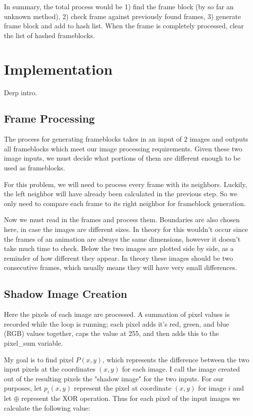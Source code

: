 \documentclass[conference]{IEEEtran}
\begin{document}
In summary, the total process would be 1) find the frame block (by so far an unknown method), 2) check frame against previously found frames, 3) generate frame block and add to hash list. When the frame is completely processed, clear the list of hashed frameblocks.

\section{Implementation}
\label{sec:implementation}
Derp intro.

\subsection{Frame Processing}
\label{subsec:frame_processing}
The process for generating frameblocks takes in an input of 2 images and
outputs all frameblocks which meet our image processing requirements.
Given these two image inputs,
we must decide what portions of them are different enough to be used as frameblocks.

For this problem, we will need to process every frame with its neighbors.
Luckily, the left neighbor will have already been calculated in the previous step.
So we only need to compare each frame to its right neighbor for frameblock generation.

Now we must read in the frames and process them.
Boundaries are also chosen here, in case the images are different sizes.
In theory for this wouldn't occur since the frames of an animation are always the same dimensions,
however it doesn't take much time to check. Below the two images are plotted side by side,
as a reminder of how different they appear.
In theory these images should be two consecutive frames,
which usually means they will have very small differences.

\subsection{Shadow Image Creation}
\label{subsec:shadow_image_creation}
Here the pixels of each image are processed.
A summation of pixel values is recorded while the loop is running;
each pixel adds it's red, green, and blue (RGB) values together,
caps the value at 255, and then adds this to the pixel\_sum variable.

My goal is to find pixel $P(x,y)$,
which represents the difference between the two input
pixels at the coordinates $(x,y)$ for each image.
I call the image created out of the resulting pixels the "shadow image" for the two inputs.
For our purposes, let $p_i(x,y)$ represent the pixel at coordinate
$(x,y)$ for image $i$ and let $\oplus$ represent the XOR operation.
Thus for each pixel of the input images we calculate the following value:
\end{document}
